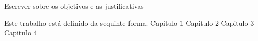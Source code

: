 
Escrever sobre os objetivos e as justificativas

Este trabalho está definido da sequinte forma. Capitulo 1 Capitulo 2 Capitulo 3 Capitulo 4 


